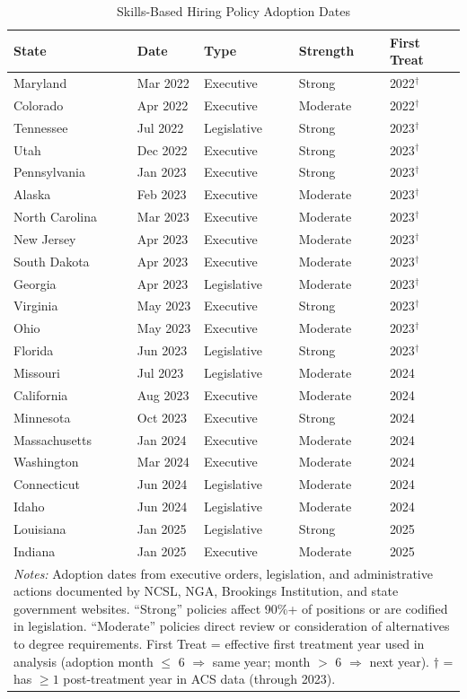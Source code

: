 \begin{table}[htbp]
\centering
\caption{Skills-Based Hiring Policy Adoption Dates}
\label{tab:adoption}
\small
\begin{tabular}{lllll}
\hline\hline
State & Date & Type & Strength & First Treat \\
\hline
Maryland & Mar 2022 & Executive & Strong & 2022$^\dagger$ \\
Colorado & Apr 2022 & Executive & Moderate & 2022$^\dagger$ \\
Tennessee & Jul 2022 & Legislative & Strong & 2023$^\dagger$ \\
Utah & Dec 2022 & Executive & Strong & 2023$^\dagger$ \\
Pennsylvania & Jan 2023 & Executive & Strong & 2023$^\dagger$ \\
Alaska & Feb 2023 & Executive & Moderate & 2023$^\dagger$ \\
North Carolina & Mar 2023 & Executive & Moderate & 2023$^\dagger$ \\
New Jersey & Apr 2023 & Executive & Moderate & 2023$^\dagger$ \\
South Dakota & Apr 2023 & Executive & Moderate & 2023$^\dagger$ \\
Georgia & Apr 2023 & Legislative & Moderate & 2023$^\dagger$ \\
Virginia & May 2023 & Executive & Strong & 2023$^\dagger$ \\
Ohio & May 2023 & Executive & Moderate & 2023$^\dagger$ \\
Florida & Jun 2023 & Legislative & Strong & 2023$^\dagger$ \\
Missouri & Jul 2023 & Legislative & Moderate & 2024 \\
California & Aug 2023 & Executive & Moderate & 2024 \\
Minnesota & Oct 2023 & Executive & Strong & 2024 \\
Massachusetts & Jan 2024 & Executive & Moderate & 2024 \\
Washington & Mar 2024 & Executive & Moderate & 2024 \\
Connecticut & Jun 2024 & Legislative & Moderate & 2024 \\
Idaho & Jun 2024 & Legislative & Moderate & 2024 \\
Louisiana & Jan 2025 & Legislative & Strong & 2025 \\
Indiana & Jan 2025 & Executive & Moderate & 2025 \\
\hline\hline
\multicolumn{5}{p{12cm}}{\footnotesize \textit{Notes:} Adoption dates from executive orders, legislation, and administrative actions documented by NCSL, NGA, Brookings Institution, and state government websites. ``Strong'' policies affect 90\%+ of positions or are codified in legislation. ``Moderate'' policies direct review or consideration of alternatives to degree requirements. First Treat = effective first treatment year used in analysis (adoption month $\leq$ 6 $\Rightarrow$ same year; month $>$ 6 $\Rightarrow$ next year). $\dagger$ = has $\geq 1$ post-treatment year in ACS data (through 2023).}
\end{tabular}
\end{table}
